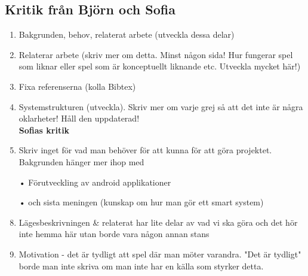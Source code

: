 \documentclass[a4paper,11pt]{article}
\begin{document}
\subsection{Kritik från Björn och Sofia}
\begin{enumerate}
\item Bakgrunden, behov, relaterat arbete (utveckla dessa delar)
\item Relaterar arbete (skriv mer om detta. Minst någon sida! Hur fungerar spel som liknar eller spel som är konceptuellt liknande etc. Utveckla mycket här!)
\item Fixa referenserna (kolla Bibtex)
\item Systemstrukturen (utveckla). Skriv mer om varje grej så att det inte är några oklarheter! Håll den uppdaterad!\\
\newline
\textbf{Sofias kritik}
\item Skriv inget för vad man behöver för att kunna för att göra projektet. Bakgrunden hänger mer ihop med 
\item[•] Förutveckling av android applikationer
\item[•] och sista meningen (kunskap om hur man gör ett smart system)

\item Lägesbeskrivningen \& relaterat har lite delar av vad vi ska göra och det hör inte hemma här utan borde vara någon annan stans
\item Motivation - det är tydligt att spel där man möter varandra. "Det är tydligt" borde man inte skriva om man inte har en källa som styrker detta.
\end{enumerate}
\end{document}

